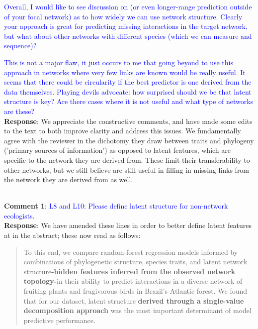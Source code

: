 \documentclass{article}
\begin{document}
\textcolor{blue}{Overall, I would like to see discussion on (or even longer-range prediction outside of your focal network) as to how widely we can use network structure. Clearly your approach is great for predicting missing interactions in the target network, but what about other networks with different species (which we can measure and sequence)?}

\textcolor{blue}{This is not a major flaw, it just occurs to me that going beyond to use this approach in networks where very few links are known would be really useful. It seems that there could be circularity if the best predictor is one derived from the data themselves. Playing devils advocate: how surprised should we be that latent structure is key? Are there cases where it is not useful and what type of networks are these?}
\newline
\\
\textbf{Response}: We appreciate the constructive comments, and have made some edits to the text to both improve clarity and address this issues. We fundamentally agree with the reviewer in the dichotomy they draw between traits and phylogeny ('primary sources of information') as opposed to latent features, which are specific to the network they are derived from. These limit their transferability to other networks, but we still believe are still useful in filling in missing links from the network they are derived from as well. 

\\
\textbf{Comment 1}: \textcolor{blue} {L8 and L10: Please define latent structure for non-network ecologists.} \\
\textbf{Response}: We have amended these lines in order to better define latent features at in the abstract; these now read as follows: 
\begin{quote}
    To this end, we compare random-forest regression models informed by combinations of phylogenetic structure, species traits, and latent network structure\textbf{-hidden features inferred from the observed network topology-}in their ability to predict interactions in a diverse network of fruiting plants and frugivorous birds in Brazil's Atlantic forest. We found that for our dataset, latent structure \textbf{derived through a single-value decomposition approach} was the most important determinant of model predictive performance. 
\end{quote} \\
\end{document}
